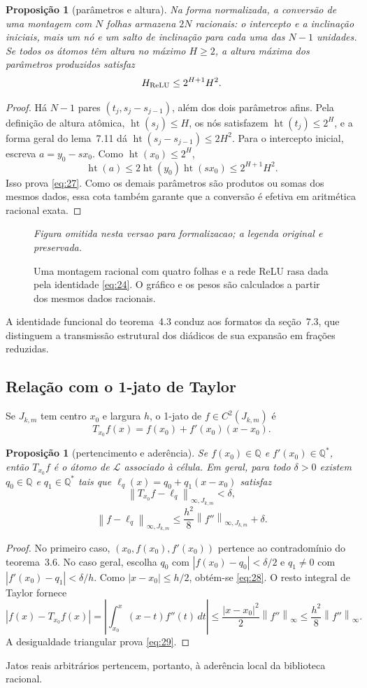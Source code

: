 \documentclass[11pt,a4paper]{article}
\theoremstyle{preciso}
\newtheorem{proposicao}[teorema]{Proposição}
\theoremstyle{definition}
\newcommand{\Q}{\mathbb Q}
\newcommand{\LL}{\mathcal L}
\newcommand{\heightq}{\operatorname{ht}}
\newcommand{\norm}[1]{\left\|#1\right\|_{\infty}}
\newcommand{\normK}[2]{\left\|#1\right\|_{\infty,#2}}
\newcommand{\eqn}[2]{\begin{equation}\label{eq:#1}#2\end{equation}}
\newcommand{\figura}[4]{\begin{figure}[!htbp]\centering
 \emph{Figura omitida nesta versao para formalizacao; a legenda original e preservada.}
 \caption{#3}\label{fig:#4}\end{figure}}
\begin{document}
\begin{proposicao}[parâmetros e altura]
Na forma normalizada, a conversão de uma montagem com $N$ folhas armazena $2N$ racionais: o intercepto e a inclinação iniciais, mais um nó e um salto de inclinação para cada uma das $N-1$ unidades. Se todos os átomos têm altura no máximo $H\ge2$, a altura máxima dos parâmetros produzidos satisfaz
\eqn{27}{H_{\rm ReLU}\le2^{H+1}H^2.}
\end{proposicao}
\begin{proof}
Há $N-1$ pares $(t_j,s_j-s_{j-1})$, além dos dois parâmetros afins. Pela definição de altura atômica, $\heightq(s_j)\le H$, os nós satisfazem $\heightq(t_j)\le2^H$, e a forma geral do lema~7.11 dá $\heightq(s_j-s_{j-1})\le2H^2$. Para o intercepto inicial, escreva $a=y_0-sx_0$. Como $\heightq(x_0)\le2^H$,
\[
\heightq(a)\le2\heightq(y_0)\heightq(sx_0)\le2^{H+1}H^2.
\]
Isso prova \eqref{eq:27}. Como os demais parâmetros são produtos ou somas dos mesmos dados, essa cota também garante que a conversão é efetiva em aritmética racional exata.
\end{proof}
\figura{04_relu}{1}{Uma montagem racional com quatro folhas e a rede ReLU rasa dada pela identidade \eqref{eq:24}. O gráfico e os pesos são calculados a partir dos mesmos dados racionais.}{relu}
A identidade funcional do teorema~4.3 conduz aos formatos da seção~7.3, que distinguem a transmissão estrutural dos diádicos de sua expansão em frações reduzidas.

\subsection{Relação com o 1-jato de Taylor}
Se $J_{k,m}$ tem centro $x_0$ e largura $h$, o 1-jato de $f\in C^2(J_{k,m})$ é
\[
T_{x_0}f(x)=f(x_0)+f'(x_0)(x-x_0).
\]
\begin{proposicao}[pertencimento e aderência]
Se $f(x_0)\in\Q$ e $f'(x_0)\in\Q^*$, então $T_{x_0}f$ é o átomo de $\LL$ associado à célula. Em geral, para todo $\delta>0$ existem $q_0\in\Q$ e $q_1\in\Q^*$ tais que $\ell_q(x)=q_0+q_1(x-x_0)$ satisfaz
\eqn{28}{\normK{T_{x_0}f-\ell_q}{J_{k,m}}<\delta,}
\eqn{29}{\normK{f-\ell_q}{J_{k,m}}\le\frac{h^2}8\normK{f''}{J_{k,m}}+\delta.}
\end{proposicao}
\begin{proof}
No primeiro caso, $(x_0,f(x_0),f'(x_0))$ pertence ao contradomínio do teorema~3.6. No caso geral, escolha $q_0$ com $|f(x_0)-q_0|<\delta/2$ e $q_1\ne0$ com $|f'(x_0)-q_1|<\delta/h$. Como $|x-x_0|\le h/2$, obtém-se \eqref{eq:28}. O resto integral de Taylor fornece
\[
|f(x)-T_{x_0}f(x)|=\left|\int_{x_0}^x(x-t)f''(t)\,dt\right|
\le\frac{|x-x_0|^2}2\norm{f''}\le\frac{h^2}8\norm{f''}.
\]
A desigualdade triangular prova \eqref{eq:29}.
\end{proof}
Jatos reais arbitrários pertencem, portanto, à aderência local da biblioteca racional.
\end{document}
